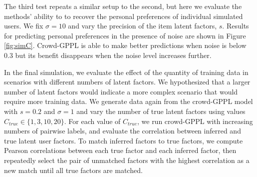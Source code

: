 The third test repeats a similar setup to the second, but here we evaluate the methods'
ability to to recover the personal preferences of individual simulated users.
We fix $\sigma = 10$ and vary the precision of the item latent factors, $s$.
Results for predicting personal preferences in the presence of noise are shown in 
Figure \ref{fig:simC}. Crowd-GPPL is able to make better predictions when noise is below
$0.3$ but its benefit disappears when the noise level increases further. 

In the final simulation, we evaluate the effect of the quantity of training data 
in scenarios with different numbers of latent factors.
We hypothesized that a larger number of latent factors would indicate a more complex
scenario that would require more training data. 
We generate data again from the crowd-GPPL model with $s=0.2$ and $\sigma=1$
and vary the number of true latent factors using values $C_{true} \in \{ 1, 3, 10, 20\}$.
For each value of $C_{true}$, we run crowd-GPPL with increasing numbers of pairwise labels,
and evaluate the correlation between inferred and true latent user factors. 
To match inferred factors to true factors, we compute Pearson correlations between each
true factor and each inferred factor, then repeatedly select the pair of unmatched 
factors with the highest correlation as a new match until all true factors are matched. 

